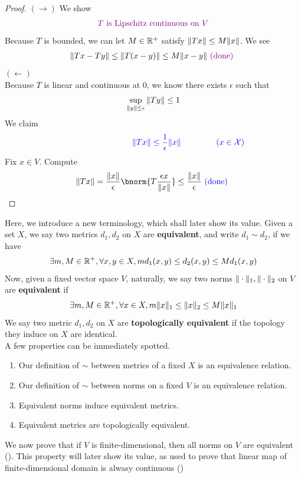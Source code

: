 \documentclass{report}
\begin{document}
\begin{proof}
$(\longrightarrow)$ We show 
\begin{align*}
\textcolor{violet}{T\text{ is Lipschitz continuous on }V}
\end{align*}
Because $T$ is bounded, we can let $M\in\mathbb{R}^+$ satisfy $\| Tx \|\leq M\| x \|$. We see 
\begin{align*}
\| Tx-Ty \|\leq \| T(x-y) \|\leq M \| x-y \|\textcolor{violet}{\text{ (done) }}
\end{align*}
$(\longleftarrow)$\\

Because $T$ is linear and continuous at $0$, we know there exists  $\epsilon $ such that 
\begin{align*}
\sup_{\| y \|\leq \epsilon } \| Ty \| \leq 1
\end{align*}
We claim 
\begin{align*}
\blue{\hspace{3cm}\norm{Tx}\leq \frac{1}{\epsilon }\norm{x}\hspace{1.5cm}(x\in \mathcal{X})}
\end{align*}
Fix $x\in V$. Compute 
\begin{align*}
\norm{Tx}= \frac{\norm{x}}{\epsilon } \bnorm{T \frac{\epsilon x}{\norm{x}}}\leq \frac{\norm{x}}{\epsilon}\bdone
\end{align*}
\end{proof}
\begin{mdframed}
Here, we introduce a new terminology, which shall later show its value. Given a set $X$, we say two metrics $d_1,d_2$ on $X$ are \textbf{equivalent}, and write $d_1\sim d_2$, if we have 
\begin{align*}
\exists m,M \in\mathbb{R}^+, \forall x ,y\in X, md_1(x,y)\leq d_2(x,y) \leq Md_1(x,y)
\end{align*}
Now, given a fixed vector space $V$, naturally, we say two norms $\| \cdot \|_1,\| \cdot \|_2$ on $V$ are \textbf{equivalent} if 
\begin{align*}
\exists m,M \in\mathbb{R}^+, \forall x\in X, m \| x \|_1\leq \| x \|_2 \leq M\| x \|_1
\end{align*}
We say two metric $d_1,d_2$ on  $X$ are  \textbf{topologically equivalent} if the topology they induce on $X$ are identical.\\

A few properties can be immediately spotted.  
\begin{enumerate}[label=(\alph*)]
  \item Our definition of $\sim$ between metrics of a fixed $X$ is an equivalence relation.
  \item Our definition of $\sim$ between norms on a fixed $V$ is an equivalence relation.
  \item Equivalent norms induce equivalent metrics.
  \item Equivalent metrics are topologically equivalent. 
\end{enumerate}

We now prove that if $V$ is finite-dimensional, then all norms on  $V$ are equivalent (). This property will later show its value, as used to prove that linear map of finite-dimensional domain is alwasy continuous ()
\end{mdframed}
\end{document}
